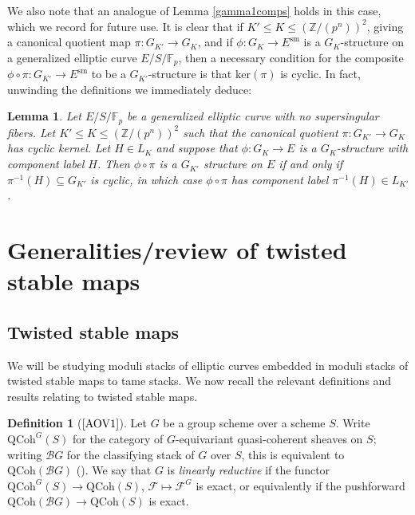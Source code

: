 \documentclass[11pt]{amsart}
\newtheorem{lemma}[subsection]{Lemma}
\theoremstyle{definition}
\newtheorem{definition}[subsection]{Definition}
\begin{document}
We also note that an analogue of Lemma \ref{gamma1comps} holds in this case, which we record for future use. It is clear that if $K' \leq K \leq (\mathbb{Z}/(p^n))^2$, giving a canonical quotient map $\pi: G_{K'} \rightarrow G_K$, and if $\phi: G_K \rightarrow E^{\mathrm{sm}}$ is a $G_K$-structure on a generalized elliptic curve $E/S/\mathbb{F}_p$, then a necessary condition for the composite $\phi \circ \pi: G_{K'} \rightarrow E^{\mathrm{sm}}$ to be a $G_{K'}$-structure is that $\mathrm{ker}(\pi)$ is cyclic. In fact, unwinding the definitions we immediately deduce:

\begin{lemma}\label{gammacomps}
Let $E/S/\mathbb{F}_p$ be a generalized elliptic curve with no supersingular fibers. Let $K' \leq K \leq (\mathbb{Z}/(p^n))^2$ such that the canonical quotient $\pi: G_{K'} \rightarrow G_K$ has cyclic kernel. Let $H \in L_K$ and suppose that $\phi: G_K \rightarrow E$ is a $G_K$-structure with component label $H$. Then $\phi \circ \pi$ is a $G_{K'}$ structure on $E$ if and only if $\pi^{-1}(H) \subseteq G_{K'}$ is cyclic, in which case $\phi \circ \pi$ has component label $\pi^{-1}(H) \in L_{K'}$.
\end{lemma}

\section{Generalities/review of twisted stable maps}

\subsection*{Twisted stable maps}

We will be studying moduli stacks of elliptic curves embedded in moduli stacks of twisted stable maps to tame stacks. We now recall the relevant definitions and results relating to twisted stable maps.

\begin{definition}[$\textrm{\cite[2.2]{AOV1}}$]
Let $G$ be a group scheme over a scheme $S$. Write $\mathrm{QCoh}^G(S)$ for the category of $G$-equivariant quasi-coherent sheaves on $S$; writing ${\mathcal{B}} G$ for the classifying stack of $G$ over $S$, this is equivalent to $\mathrm{QCoh}({\mathcal{B}} G)$ (\cite[\S2.1]{AOV1}). We say that $G$ is \textit{linearly reductive} if the functor $\mathrm{QCoh}^G(S) \rightarrow \mathrm{QCoh}(S)$, $\mathcal{F} \mapsto \mathcal{F}^G$ is exact, or equivalently if the pushforward $\mathrm{QCoh}({\mathcal{B}} G) \rightarrow \mathrm{QCoh}(S)$ is exact.
\end{definition}
\end{document}
